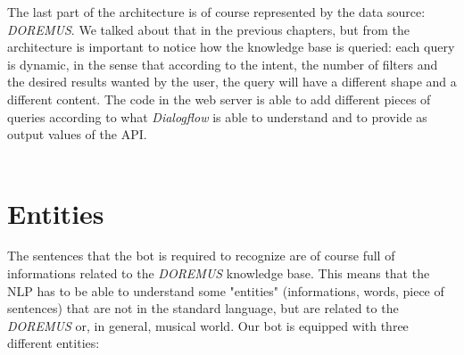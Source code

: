 \documentclass[a4paper,12pt]{report}
\begin{document}
	The last part of the architecture is of course represented by the data source: \textit{DOREMUS}. We talked about that in the previous chapters, but from the architecture is important to notice how the knowledge base is queried: each query is dynamic, in the sense that according to the intent, the number of filters and the desired results wanted by the user, the query will have a different shape and a different content. The code in the web server is able to add different pieces of queries according to what \textit{Dialogflow} is able to understand and to provide as output values of the API.\\\\
	
	\section{Entities}
	The sentences that the bot is required to recognize are of course full of informations related to the \textit{DOREMUS} knowledge base. This means that the NLP has to be able to understand some "entities" (informations, words, piece of sentences) that are not in the standard language, but are related to the \textit{DOREMUS} or, in general, musical world. Our bot is equipped with three different entities:
\end{document}
